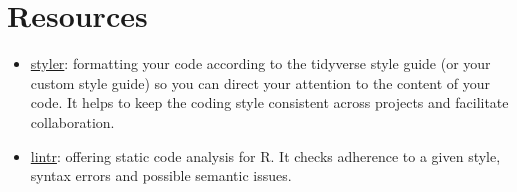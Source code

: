 \documentclass[
]{book}
\providecommand{\tightlist}{%
  \setlength{\itemsep}{0pt}\setlength{\parskip}{0pt}}
\begin{document}
\hypertarget{resources-1}{%
\section{Resources}\label{resources-1}}

\begin{itemize}
\tightlist
\item
  \href{https://github.com/r-lib/styler}{styler}: formatting your code according to
  the tidyverse style guide (or your custom style guide) so you can direct your
  attention to the content of your code. It helps to keep the coding style
  consistent across projects and facilitate collaboration.
\item
  \href{https://github.com/r-lib/lintr}{lintr}: offering static code analysis for R.
  It checks adherence to a given style, syntax errors and possible semantic
  issues.
\end{itemize}
\end{document}
